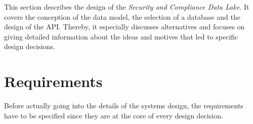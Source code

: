
This section describes the design of the \textit{Security and Compliance Data Lake}. It covers the conception of the data model, the selection of a database and the design of the API. Thereby, it especially discusses alternatives and focuses on giving detailed information about the ideas and motives that led to specific design decisions.

\section{Requirements} \label{sec:Requirements}
Before actually going into the details of the systems design, the requirements have to be specified since they are at the core of every design decision.  

